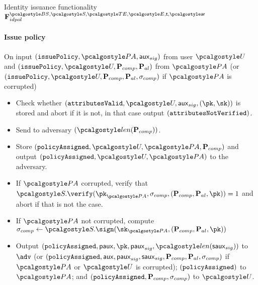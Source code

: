 \documentclass[runningheads,10pt]{llncs}
\numberwithin{equation}{section}
\begin{document}
\begin{funcbox}{Identity issuance functionality
    $\func{idpol}^{\BSIG, \SIG, \TENC, \ENC, \thresholdar, \noofar}$}
\paragraph{Issue policy}
On input $(\issuePolicy, \polas, \aux_{sig})$ from user $\user$ and
$(\issuePolicy, \user, \comppolicy, \alpolicy)$ from $\polas$ (or
$(\issuePolicy, \user, \comppolicy, \alpolicy, \signature_{comp})$ if $\polas$ is
corrupted)
\begin{itemize}
\item Check whether $(\attributesValid,  \user, \aux_{sig}, (\pk, \sk))$ is stored and
  abort if it is not, in that case output $(\mathtt{attributesNotVerified})$.
\item Send to adversary $(\length{\comppolicy})$.
\item Store $(\policyAssigned, \user, \polas, \comppolicy)$ and output
  $(\policyAssigned, \user, \polas)$ to the adversary.
\item If $\polas$ corrupted, verify that $\SIG.\verify(\pk_{\polas},
  \signature_{comp}, (\comppolicy, \alpolicy, \pk)) = 1$ and abort if that is not the case.
\item If $\polas$ not corrupted, compute $\signature_{comp} \gets
  \SIG.\sign(\sk_{\polas}, (\comppolicy, \alpolicy, \pk))$
\item Output $(\policyAssigned, \paux, \pk, \paux_{sig}, \length{\saux_{sig}})$  to $\adv$ (or
  $(\mathtt{policyAssigned}, \mathsf{aux}, \mathsf{paux}_{sig}, \mathsf{saux}_{sig}, \mathbf{P}_{comp}, \mathbf{P}_{al}, \sigma_{comp})$ if $\polas$ or
  $\user$ is corrupted); $(\mathtt{policyAssigned})$ to $\polas$; and
  $(\mathtt{policyAssigned}, \mathbf{P}_{comp}, \sigma_{comp})$ to $\user$.
\end{itemize}
\end{funcbox}
\end{document}
